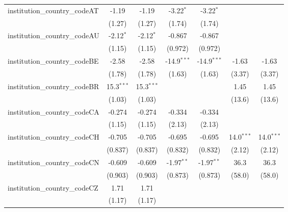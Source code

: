 \begin{tabular}{lcccccc}
   institution\_country\_codeAT          & -1.19         & -1.19         & -3.22$^{*}$   & -3.22$^{*}$   &               &   \\   
                                         & (1.27)        & (1.27)        & (1.74)        & (1.74)        &               &   \\   
   institution\_country\_codeAU          & -2.12$^{*}$   & -2.12$^{*}$   & -0.867        & -0.867        &               &   \\   
                                         & (1.15)        & (1.15)        & (0.972)       & (0.972)       &               &   \\   
   institution\_country\_codeBE          & -2.58         & -2.58         & -14.9$^{***}$ & -14.9$^{***}$ & -1.63         & -1.63\\   
                                         & (1.78)        & (1.78)        & (1.63)        & (1.63)        & (3.37)        & (3.37)\\   
   institution\_country\_codeBR          & 15.3$^{***}$  & 15.3$^{***}$  &               &               & 1.45          & 1.45\\   
                                         & (1.03)        & (1.03)        &               &               & (13.6)        & (13.6)\\   
   institution\_country\_codeCA          & -0.274        & -0.274        & -0.334        & -0.334        &               &   \\   
                                         & (1.15)        & (1.15)        & (2.13)        & (2.13)        &               &   \\   
   institution\_country\_codeCH          & -0.705        & -0.705        & -0.695        & -0.695        & 14.0$^{***}$  & 14.0$^{***}$\\   
                                         & (0.837)       & (0.837)       & (0.832)       & (0.832)       & (2.12)        & (2.12)\\   
   institution\_country\_codeCN          & -0.609        & -0.609        & -1.97$^{**}$  & -1.97$^{**}$  & 36.3          & 36.3\\   
                                         & (0.903)       & (0.903)       & (0.873)       & (0.873)       & (58.0)        & (58.0)\\   
   institution\_country\_codeCZ          & 1.71          & 1.71          &               &               &               &   \\   
                                         & (1.17)        & (1.17)        &               &               &               &   \\   

\end{tabular}
